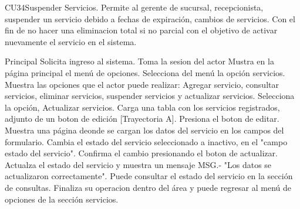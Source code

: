 



	\begin{UseCase}{CU34}{Suspender Servicios.}{
		Permite al gerente de sucursal, recepcionista, suspender un servicio debido a fechas de expiración, cambios de servicios.
	Con el fin de no hacer una eliminacion total si no parcial con el objetivo de activar nuevamente el servicio en el sistema.
	}
	\end{UseCase}

	\begin{UCtrayectoria}{Principal}
		\UCpaso Solicita ingreso al sistema.
		\UCpaso Toma la sesion del actor
		\UCpaso Mustra en la página principal el menú de opciones.
		\UCpaso[\UCactor] Selecciona del menú la opción servicios.
		\UCpaso Muestra las opciones que el actor puede realizar: Agregar servicio, consultar servicios, eliminar servicios, suspender servicios y actualizar servicios.
		\UCpaso[\UCactor] Selecciona la opción, Actualizar servicios.
		\UCpaso Carga una tabla con los servicios registrados, adjunto de un boton de edición [Trayectoria A].
		\UCpaso[\UCactor] Presiona el boton de editar.
		\UCpaso Muestra una página deonde se cargan los datos del servicio en los campos del formulario.
		\UCpaso[\UCactor] Cambia el estado del servicio seleccionado a inactivo, en el "campo estado del servicio".
		\UCpaso[\UCactor] Confirma el cambio presionando el boton de actualizar.
		\UCpaso Actualza el estado del servicio y muestra un mensaje MSG.- "Los datos se actualizaron correctamente". 
		\UCpaso[\UCactor] Puede consultar el estado del servicio en la sección de consultas.
		\UCpaso[\UCactor] Finaliza su operacion dentro del área y puede regresar al menú de opciones de la sección servicios.
	\end{UCtrayectoria}

